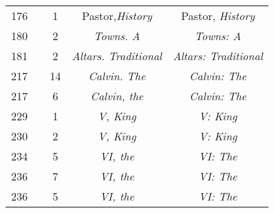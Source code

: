 \documentclass[a4paper,11pt]{article}
\begin{document}
\begin{center}
\begin{tabular}{|c|c|c|c|c|}
    176 & &  1 & Pastor,\textit{History} & Pastor, \textit{History} \\
    180 & &  2 & \textit{Towns. A} & \textit{Towns: A} \\
    181 & &  2 & \textit{Altars. Traditional}
           & \textit{Altars: Traditional} \\
    217 & & 14 & \textit{Calvin. The} & \textit{Calvin: The} \\
    217 & &  6 & \textit{Calvin, the} & \textit{Calvin: The} \\
    229 & &  1 & \textit{V, King} & \textit{V: King} \\
    230 & &  2 & \textit{V, King} & \textit{V: King} \\
    234 & &  5 & \textit{VI, the} & \textit{VI: The} \\
    236 & &  7 & \textit{VI, the} & \textit{VI: The} \\
    236 & &  5 & \textit{VI, the} & \textit{VI: The} \\
    \hline
  \end{tabular}






\end{center}
\end{document}
